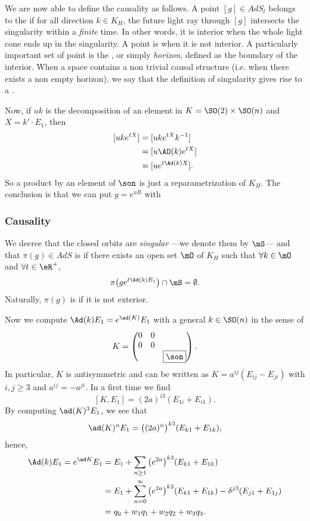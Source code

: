 We are now able to define the causality as follows.  A point $[g]\in AdS_l$ belongs to the  if for all direction $k\in K_H$, the future light ray through $[g]$ intersects the singularity within a \emph{finite} time.  In other words, it is interior when the whole light cone ends up in the singularity.  A point is  when it is not interior.  A particularly important set of point is the , or simply \emph{horizon}, defined as the boundary of the interior. When a space contains a non trivial causal structure (i.e. when there exists a non empty horizon), we say that the definition of singularity gives rise to a .  

Now, if $uk$ is the decomposition of an element in $K=\SO(2)\times \SO(n)$ and $X=k'\cdot E_1$, then
\begin{equation}
\begin{split}
[uke^{tX}]&=[uke^{tX}k^{-1}]\\
          &=[u\AD(k)e^{tX}]\\
          &=[ue^{t\Ad(k)X}].
\end{split}
\end{equation}
So a product by an element of $\son$ is just a reparametrization of $K_H$. The conclusion is that we can put $g=e^{uR}$ with

\subsubsection{Causality}

We decree that the closed orbits are \emph{singular} ---we denote them by $\mS$--- and that $\pi(g)\in AdS$ is  if there exists an open set $\mO$ of $K_H$ such that $\forall k\in\mO$ and $\forall t\in\eR^+$,
\[
  \pi\big( g e^{t\Ad(k)E_1}  \big)\cap\mS=\emptyset.
\]
Naturally, $\pi(g)$ is  if it is not exterior. 

Now we compute $\Ad(k)E_1=e^{\ad(K)}E_1$ with a general $k\in \SO(n)$ in the sense of
\[
K=\begin{pmatrix}
0&0\\
0&0\\
&&\fbox{$\son$}
\end{pmatrix}.
\]
In particular, $K$ is antisymmetric and can be written as $K=a^{ij}(E_{ij}-E_{ji})$ with $i,j\geq 3$ and $a^{ij}=-a^{ji}$. In a first time we find
\[
[K,E_1]=(2a)^{i3}(E_{1i}+E_{i1}).
\]
By computing $\ad(K)^3E_1$, we see that
\[
\ad(K)^nE_1=\big((2a)^n\big)^{k3}(E_{k1}+E_{1k}),
\]
hence,
\begin{equation} \label{eq:Adkeu}
\begin{split}
\Ad(k)E_1=e^{\ad K}E_1&=E_1+\sum_{n\geq 1}\big(e^{2a}\big)^{k3}(E_{k1}+E_{1k})\\
	      &=E_1+\sum_{n=0}^{\infty}\big(e^{2a}\big)^{k3}(E_{k1}+E_{1k})-\delta^{j3}(E_{j1}+E_{1j})\\
	      &=q_0+w_1q_1+w_2q_2+w_3q_3.
\end{split}
\end{equation}

